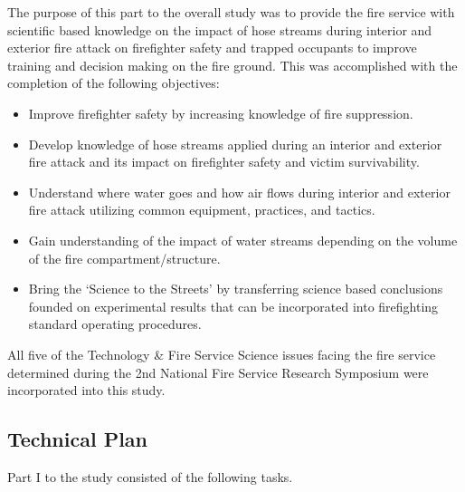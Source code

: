 \documentclass{article}
\begin{document}
The purpose of this part to the overall study was to provide the fire service with scientific based knowledge on the impact of hose streams during interior and exterior fire attack on firefighter safety and trapped occupants to improve training and decision making on the fire ground. This was accomplished with the completion of the following objectives:

\begin{itemize}
	\item Improve firefighter safety by increasing knowledge of fire suppression.
	\item Develop knowledge of hose streams applied during an interior and exterior fire attack and its impact on firefighter safety and victim survivability.
	\item Understand where water goes and how air flows during interior and exterior fire attack utilizing common equipment, practices, and tactics.
	\item Gain understanding of the impact of water streams depending on the volume of the fire compartment/structure.
	\item Bring the `Science to the Streets' by transferring science based conclusions founded on experimental results that can be incorporated into firefighting standard operating procedures.
	\end{itemize}

All five of the Technology \& Fire Service Science issues facing the fire service determined during the 2nd National Fire Service Research Symposium \cite{NFFF} were incorporated into this study.

\clearpage

\subsection{Technical Plan}

Part I to the study consisted of the following tasks. 
\end{document}
